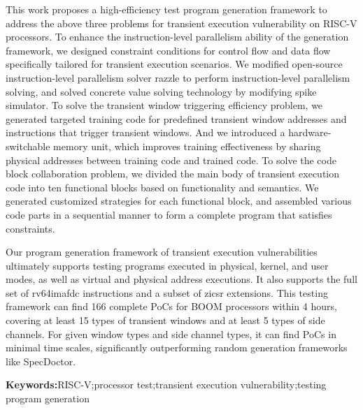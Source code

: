 This work proposes a high-efficiency test program generation framework
to address the above three problems for transient execution vulnerability on RISC-V processors.
To enhance the instruction-level parallelism ability of the generation framework, 
we designed constraint conditions for control flow and data flow specifically tailored for transient execution scenarios. 
We modified open-source instruction-level parallelism solver razzle to perform instruction-level parallelism solving, 
and solved concrete value solving technology by modifying spike simulator.
To solve the transient window triggering efficiency problem,
we generated targeted training code for predefined transient window addresses and instructions 
that trigger transient windows. 
And we introduced a hardware-switchable memory unit, 
which improves training effectiveness by sharing physical addresses between training code and trained code.
To solve the code block collaboration problem, 
we divided the main body of transient execution code into ten functional blocks based on functionality and semantics. 
We generated customized strategies for each functional block, 
and assembled various code parts in a sequential manner 
to form a complete program that satisfies constraints.\par

Our program generation framework of transient execution vulnerabilities 
ultimately supports testing programs executed in physical, kernel, and user modes, 
as well as virtual and physical address executions. 
It also supports the full set of rv64imafdc instructions and a subset of zicsr extensions. 
This testing framework can find 166 complete PoCs for BOOM processors within 4 hours, 
covering at least 15 types of transient windows and at least 5 types of side channels. 
For given window types and side channel types, it can find PoCs in minimal time scales, 
significantly outperforming random generation frameworks like SpecDoctor.\par

\textbf{Keywords:}RISC-V;processor test;transient execution vulnerability;testing program generation


